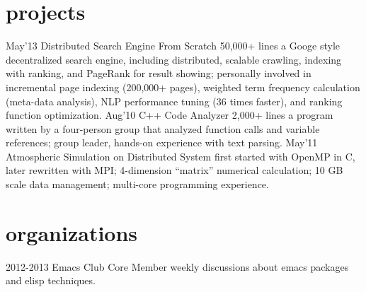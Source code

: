 \documentclass[]{friggeri-cv}
\begin{document}
\section{projects}
\begin{entrylist}
  \entry
  {May'13}
  {Distributed Search Engine From Scratch}
  {50,000+ lines}
  {a Googe style decentralized search engine, including distributed, scalable crawling, indexing with ranking, and PageRank for result showing; personally involved in incremental page indexing (200,000+ pages), weighted term frequency calculation (meta-data analysis), NLP performance tuning (36 times faster), and ranking function optimization.}
  \entry
  {Aug'10}
  {C++ Code Analyzer}
  {2,000+ lines}
  {a program written by a four-person group that analyzed function calls and variable references; group leader, hands-on experience with text parsing.}
  \entry
  {May'11}
  {Atmospheric Simulation on Distributed System}
  {}
  {first started with OpenMP in C, later rewritten with MPI; 4-dimension “matrix” numerical calculation; 10 GB scale data management; multi-core programming experience.}
\end{entrylist}
\section{organizations}
\begin{entrylist}
  \entry
  {2012-2013}
  {Emacs Club}
  {Core Member}
  {weekly discussions about emacs packages and elisp techniques.}
\end{entrylist}
\end{document}
